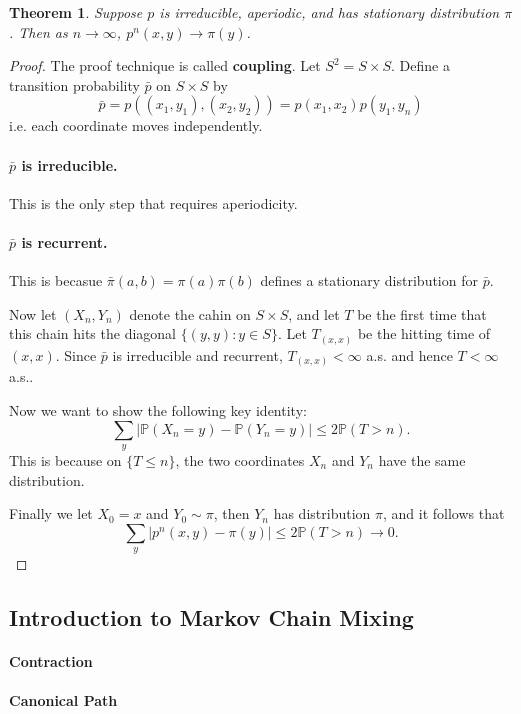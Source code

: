 \documentclass{article}
\newtheorem{Thm}{Theorem}[section]
\theoremstyle{definition}
\newcommand{\PP}{\mathbb{P}}
\renewcommand{\leq}{\leqslant}
\newcommand{\<}{\left\langle}
\renewcommand{\>}{\right\rangle}
\begin{document}
\begin{Thm}
    Suppose $p$ is irreducible, aperiodic, and has stationary distribution $\pi$. Then as $n\to\infty$, $p^n(x,y)\to \pi(y)$.
\end{Thm}
\begin{proof}
    The proof technique is called \textbf{coupling}. Let $S^2=S\times S$. Define a transition probability $\bar{p}$ on $S\times S$ by 
    \[ \bar{p}=p((x_1,y_1),(x_2,y_2))=p(x_1,x_2)p(y_1,y_n) \] 
    i.e. each coordinate moves independently. 

    \paragraph{ $\bar{p}$ is irreducible.} This is the only step that requires aperiodicity.

    \paragraph{ $\bar{p}$ is recurrent.} This is becasue $\bar{\pi}(a,b)=\pi(a)\pi(b)$ defines a stationary distribution for $\bar{p}$. 

    Now let $(X_n,Y_n)$ denote the cahin on $S\times S$, and let $T$ be the first time that this chain hits the diagonal $\{(y,y):y\in S\}$. Let 
    $T_{(x,x)}$ be the hitting time of $(x,x)$. Since $\bar{p}$ is irreducible and recurrent, $T_{(x,x)}<\infty$ a.s. and hence $T<\infty$ a.s..

    Now we want to show the following key identity:
    \[\sum_{y}|\PP(X_n=y)-\PP(Y_n=y)|\leq 2 \PP(T>n). \] 
    This is because on $\{T\leq n\}$, the two coordinates $X_n$ and $Y_n$ have the same distribution.

    Finally we let $X_0=x$ and $Y_0\sim \pi$, then $Y_n$ has distribution $\pi$, and it follows that 
    \[\sum_{y}|p^n(x,y)-\pi(y)|\leq 2 \PP(T>n)\to 0. \] 
\end{proof}

\subsection{Introduction to Markov Chain Mixing}

\paragraph{Contraction}

\paragraph{Canonical Path}
\end{document}
